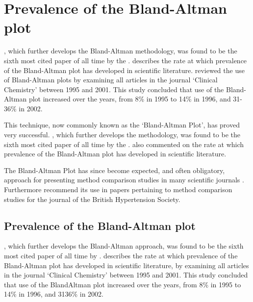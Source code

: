 \documentclass[MAIN.tex]{subfiles}
\begin{document}
\section{Prevalence of the Bland-Altman plot}

\citet*{BA86}, which further develops the Bland-Altman methodology,
was found to be the sixth most cited paper of all time by the
\citet{BAcite}. \cite{Dewitte} describes the rate at which
prevalence of the Bland-Altman plot has developed in scientific
literature. \citet{Dewitte} reviewed the use of Bland-Altman plots
by examining all articles in the journal `Clinical Chemistry'
between 1995 and 2001. This study concluded that use of the
Bland-Altman plot increased over the years, from 8\% in 1995 to
14\% in 1996, and 31-36\% in 2002.



\bigskip

	This technique, now commonly known as
	the `Bland-Altman Plot', has proved very successful.
	\citet*{BA86}, which further develops the methodology, was found
	to be the sixth most cited paper of all time by the
	\citet{BAcite}. \cite{Dewitte} also commented on the rate at which
	prevalence of the Bland-Altman plot has developed in scientific
	literature. 
	

	
	The Bland-Altman Plot has since become expected, and
	often obligatory, approach for presenting method comparison
	studies in many scientific journals \citep{hollis}. Furthermore
	\citet{BritHypSoc} recommend its use in papers pertaining to
	method comparison studies for the journal of the British
	Hypertension Society.
	


	
\subsection{Prevalence of the Bland-Altman plot}
\citet*{BA86}, which further develops the Bland-Altman approach, was found to be the sixth most cited paper of all time by \citet{BAcite}. \cite{Dewitte} describes the rate at which	prevalence of the Bland-Altman plot has developed in scientific literature, by examining all articles in the journal `Clinical Chemistry' between 1995 and 2001. This study concluded that use of the BlandAltman plot increased over the years, from 8\% in 1995 to 14\% in 1996, and 3136\% in 2002.
\end{document}
